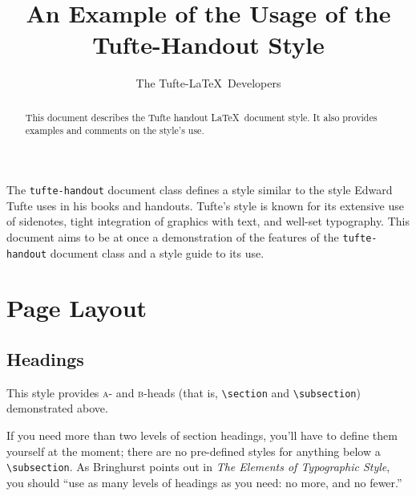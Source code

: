 \documentclass{tufte-handout}
\title{An Example of the Usage of the Tufte-Handout Style}
\author{The Tufte-\LaTeX\ Developers}
\begin{document}
\maketitle %

\begin{abstract}
\noindent This document describes the Tufte handout \LaTeX\ document style.
It also provides examples and comments on the style's use.
\end{abstract}


The \Verb|tufte-handout| document class defines a style similar to the
style Edward Tufte uses in his books and handouts.  Tufte's style is known
for its extensive use of sidenotes, tight integration of graphics with
text, and well-set typography.  This document aims to be at once a
demonstration of the features of the \Verb|tufte-handout| document class
and a style guide to its use.

\section{Page Layout}\label{sec:page-layout}
\subsection{Headings}\label{sec:headings}
This style provides \textsc{a}- and \textsc{b}-heads (that is,
\Verb|\section| and \Verb|\subsection|) demonstrated above.

If you need more than two levels of section headings, you'll have to define
them yourself at the moment; there are no pre-defined styles for anything below a
\Verb|\subsection|.  As Bringhurst points out in \textit{The Elements of
Typographic Style},\cite{Bringhurst2005} you should ``use as many levels of
headings as you need: no more, and no fewer.''
\end{document}
